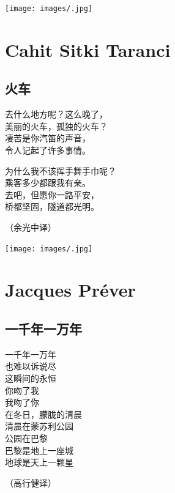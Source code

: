 \documentclass[
]{book}
\renewenvironment{quote}{\begin{VF}}{\end{VF}}
\begin{document}
\texttt{[image: images/.jpg]}

\hypertarget{cahit-sitki-taranci}{%
\chapter{Cahit Sitki Taranci}\label{cahit-sitki-taranci}}

\hypertarget{section-57}{%
\section{火车}\label{section-57}}

\begin{quote}
去什么地方呢？这么晚了，\\
美丽的火车，孤独的火车？\\
凄苦是你汽笛的声音，\\
令人记起了许多事情。

为什么我不该挥手舞手巾呢？\\
乘客多少都跟我有亲。\\
去吧，但愿你一路平安，\\
桥都坚固，隧道都光明。

（余光中译）
\end{quote}

\texttt{[image: images/.jpg]}

\hypertarget{jacques-prever}{%
\chapter{Jacques Préver}\label{jacques-prever}}

\hypertarget{section-58}{%
\section{一千年一万年}\label{section-58}}

\begin{quote}
一千年一万年\\
也难以诉说尽\\
这瞬间的永恒\\
你吻了我\\
我吻了你\\
在冬日，朦胧的清晨\\
清晨在蒙苏利公园\\
公园在巴黎\\
巴黎是地上一座城\\
地球是天上一颗星

（高行健译）
\end{quote}
\end{document}
